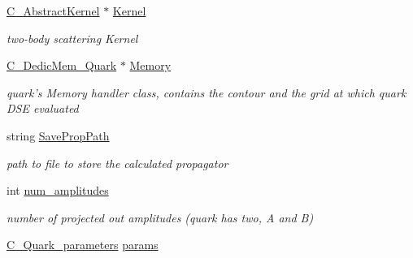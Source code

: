 \begin{DoxyCompactItemize}
\item 
\hypertarget{class_c___quark_a825f0f4638fa87322db6af8335d6f05b}{\hyperlink{class_c___abstract_kernel}{C\-\_\-\-Abstract\-Kernel} $\ast$ \hyperlink{class_c___quark_a825f0f4638fa87322db6af8335d6f05b}{Kernel}}\label{class_c___quark_a825f0f4638fa87322db6af8335d6f05b}

\begin{DoxyCompactList}\small\item\em two-\/body scattering Kernel \end{DoxyCompactList}\item 
\hypertarget{class_c___quark_a9eb8b047110e9217c8dc615c9938566c}{\hyperlink{class_c___dedic_mem___quark}{C\-\_\-\-Dedic\-Mem\-\_\-\-Quark} $\ast$ \hyperlink{class_c___quark_a9eb8b047110e9217c8dc615c9938566c}{Memory}}\label{class_c___quark_a9eb8b047110e9217c8dc615c9938566c}

\begin{DoxyCompactList}\small\item\em quark's Memory handler class, contains the contour and the grid at which quark D\-S\-E evaluated \end{DoxyCompactList}\item 
\hypertarget{class_c___quark_a6658a59e332c14057398ba12ad2eb36b}{string \hyperlink{class_c___quark_a6658a59e332c14057398ba12ad2eb36b}{Save\-Prop\-Path}}\label{class_c___quark_a6658a59e332c14057398ba12ad2eb36b}

\begin{DoxyCompactList}\small\item\em path to file to store the calculated propagator \end{DoxyCompactList}\item 
\hypertarget{class_c___quark_a9b47aa812f3e3abf90acfb570ae51617}{int \hyperlink{class_c___quark_a9b47aa812f3e3abf90acfb570ae51617}{num\-\_\-amplitudes}}\label{class_c___quark_a9b47aa812f3e3abf90acfb570ae51617}

\begin{DoxyCompactList}\small\item\em number of projected out amplitudes (quark has two, A and B) \end{DoxyCompactList}\item 
\hypertarget{class_c___quark_aa973622070edbcb2e2e8bf12425a4277}{\hyperlink{class_c___quark__parameters}{C\-\_\-\-Quark\-\_\-parameters} \hyperlink{class_c___quark_aa973622070edbcb2e2e8bf12425a4277}{params}}\label{class_c___quark_aa973622070edbcb2e2e8bf12425a4277}


\end{DoxyCompactItemize}
